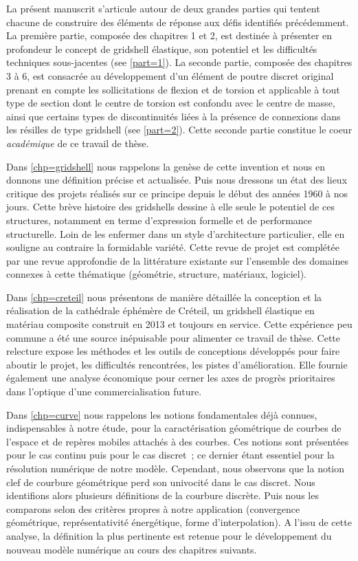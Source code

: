 La présent manuscrit s'articule autour de deux grandes parties qui tentent chacune de construire des éléments de réponse aux défis identifiés précédemment. La première partie, composée des chapitres 1 et 2, est destinée à présenter en profondeur le concept de gridshell élastique, son potentiel et les difficultés techniques sous-jacentes (see \cref{part=1}). La seconde partie, composée des chapitres 3 à 6, est consacrée au développement d'un élément de poutre discret original prenant en compte les sollicitations de flexion et de torsion et applicable à tout type de section dont le centre de torsion est confondu avec le centre de masse, ainsi que certains types de discontinuités liées à la présence de connexions dans les résilles de type gridshell (see \cref{part=2}). Cette seconde partie constitue le coeur \emph{académique} de ce travail de thèse.

Dans \cref{chp=gridshell} nous rappelons la genèse de cette invention et nous en donnons une définition précise et actualisée. Puis nous dressons un état des lieux critique des projets réalisés sur ce principe depuis le début des années 1960 à nos jours. Cette brève histoire des gridshells dessine à elle seule le potentiel de ces structures, notamment en terme d'expression formelle et de performance structurelle. Loin de les enfermer dans un style d'architecture particulier, elle en souligne au contraire la formidable variété. Cette revue de projet est complétée par une revue approfondie de la littérature existante sur l'ensemble des domaines connexes à cette thématique (géométrie, structure, matériaux, logiciel).

Dans \cref{chp=creteil} nous présentons de manière détaillée la conception et la réalisation de la cathédrale éphémère de Créteil, un gridshell élastique en matériau composite construit en 2013 et toujours en service. Cette expérience peu commune a été une source inépuisable pour alimenter ce travail de thèse. Cette relecture expose les méthodes et les outils de conceptions développés pour faire aboutir le projet, les difficultés rencontrées, les pistes d'amélioration. Elle fournie également une analyse économique pour cerner les axes de progrès prioritaires dans l'optique d'une commercialisation future.

Dans \cref{chp=curve} nous rappelons les notions fondamentales déjà connues, indispensables à notre étude, pour la caractérisation géométrique de courbes de l'espace et de repères mobiles attachés à des courbes. Ces notions sont présentées pour le cas continu puis pour le cas discret~; ce dernier étant essentiel pour la résolution numérique de notre modèle. Cependant, nous observons que la notion clef de courbure géométrique perd son univocité dans le cas discret. Nous identifions alors plusieurs définitions de la courbure discrète. Puis nous les comparons selon des critères propres à notre application (convergence géométrique, représentativité énergétique, forme d'interpolation). A l'issu de cette analyse, la définition la plus pertinente est retenue pour le développement du nouveau modèle numérique au cours des chapitres suivants.

